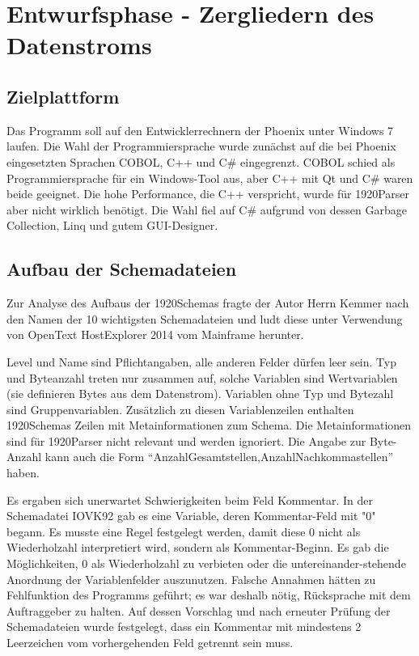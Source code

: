 \section{Entwurfsphase - Zergliedern des Datenstroms} 
\label{sec:Entwurfsphase}

\subsection{Zielplattform}
\label{sec:Zielplattform}
Das Programm soll auf den Entwicklerrechnern der Phoenix unter Windows 7 laufen. 
Die Wahl der Programmiersprache wurde zunächst auf die bei Phoenix eingesetzten Sprachen COBOL, C++ und C\# eingegrenzt. COBOL schied als Programmiersprache für ein Windows-Tool aus,  aber C++ mit Qt und C\# waren beide geeignet. Die hohe Performance, die C++ verspricht, wurde für 1920Parser aber nicht wirklich benötigt. Die Wahl fiel auf C\# aufgrund von dessen Garbage Collection, Linq und gutem GUI-Designer.

\subsection{Aufbau der Schemadateien}
\label{sec:AufbauSchemas}
Zur Analyse des Aufbaus der 1920Schemas fragte der Autor Herrn Kemmer nach den Namen der 10 wichtigsten Schemadateien und ludt diese unter Verwendung von OpenText HostExplorer 2014 vom Mainframe herunter.

Level und Name sind Pflichtangaben, alle anderen Felder dürfen leer sein. Typ und Byteanzahl treten nur zusammen auf, solche Variablen sind Wertvariablen (sie definieren Bytes aus dem Datenstrom).
Variablen ohne Typ und Bytezahl sind Gruppenvariablen.
Zusätzlich zu diesen Variablenzeilen enthalten 1920Schemas Zeilen mit Metainformationen zum Schema. Die Metainformationen sind für 1920Parser nicht relevant und werden ignoriert.
Die Angabe zur Byte-Anzahl kann auch die Form ``AnzahlGesamtstellen,AnzahlNachkommastellen'' haben.

Es ergaben sich unerwartet Schwierigkeiten beim Feld Kommentar. In der Schemadatei IOVK92 gab es eine Variable, deren Kommentar-Feld mit "0" begann. Es musste eine Regel festgelegt werden, damit diese 0 nicht als Wiederholzahl interpretiert wird, sondern als Kommentar-Beginn. Es gab die Möglichkeiten, 0 als Wiederholzahl zu verbieten oder die untereinander-stehende Anordnung der Variablenfelder auszunutzen. Falsche Annahmen hätten zu Fehlfunktion des Programms geführt; es war deshalb nötig, Rücksprache mit dem Auftraggeber zu halten. Auf dessen Vorschlag und nach erneuter Prüfung der Schemadateien wurde festgelegt, dass ein Kommentar mit mindestens 2 Leerzeichen vom vorhergehenden Feld getrennt sein muss.

